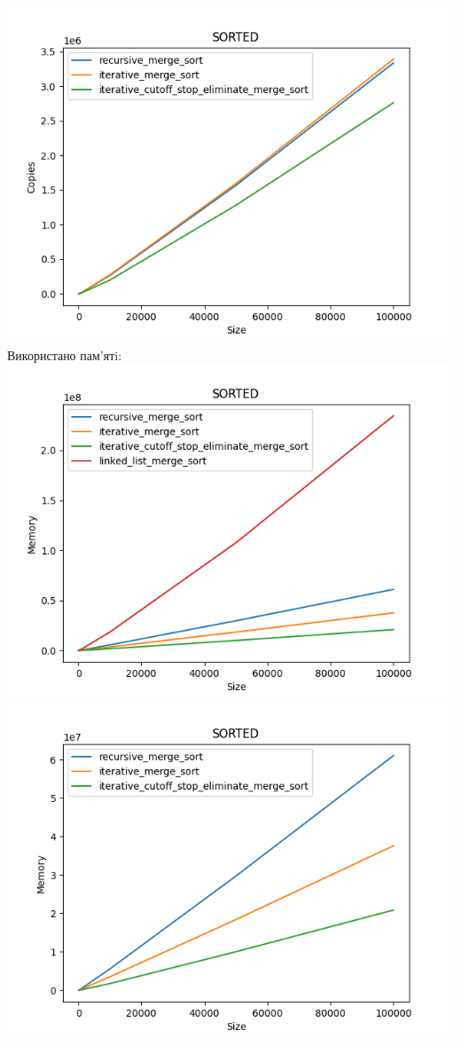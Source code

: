 \documentclass{article}
\begin{document}
        \includegraphics[scale=0.5]{sorted_Copies_3_sorts_6_numbers_50_100to100000.png}
    \newline
    Використано пам’ятi:
    \newline
        \includegraphics[scale=0.5]{sorted_Memory_4_sorts_6_numbers_50_100to100000.png}
        \includegraphics[scale=0.5]{sorted_Memory_3_sorts_6_numbers_50_100to100000.png}
    \newpage
\end{document}
